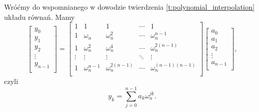 \documentclass[11pt]{scrartcl}
\begin{document}
    Wróćmy do wspomnianego w dowodzie twierdzenia \ref{t:polynomial_interpolation} układu równań. Mamy
    \begin{equation*}
        \begin{bmatrix}
            y_0 \\
            y_1 \\
            y_2 \\
            \vdots \\
            y_{n-1} \\
        \end{bmatrix}
        =
        \begin{bmatrix}
            1 & 1 & 1 & \cdots & 1 \\
            1 & \omega_n & \omega_n^2 & \cdots & \omega_n^{n-1} \\
            1 & \omega_n^2 & \omega_n^4  & \cdots & \omega_n^{2(n-1)} \\
            \vdots & \vdots  & \vdots & \ddots & \vdots    \\
            1 & \omega_n^{n-1} & \omega_n^{2(n-1)}  & \cdots & \omega_n^{(n-1)(n-1)} \\
        \end{bmatrix}
        \begin{bmatrix}
            a_0 \\
            a_1 \\
            a_2 \\
            \vdots \\
            a_{n-1} \\
        \end{bmatrix},
    \end{equation*}
    czyli
    \begin{equation}
        \label{eq:y_k}
        y_k = \sum_{j=0}^{n-1} a_k\omega_n^{jk}.
    \end{equation}
\end{document}
